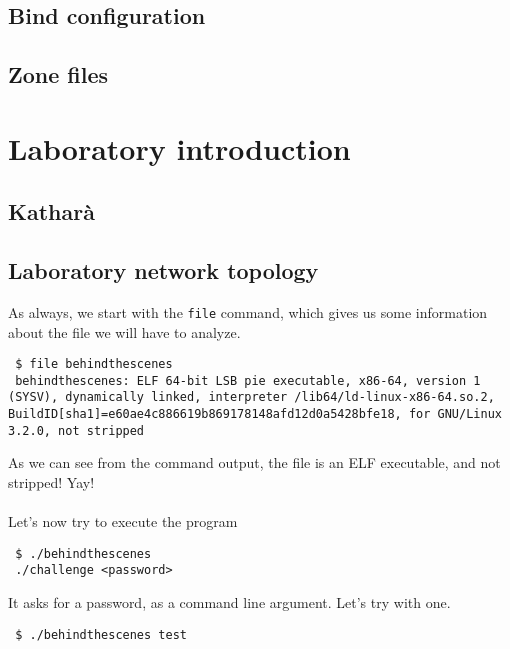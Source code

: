 \documentclass{article}
\begin{document}
\subsection{Bind configuration}

\subsection{Zone files}

\section{Laboratory introduction}

\subsection{Katharà}

\subsection{Laboratory network topology}



\noindent
As always, we start with the \texttt{file} command, which gives us some information about the file we will have to analyze.

\begin{lstlisting}
 $ file behindthescenes
 behindthescenes: ELF 64-bit LSB pie executable, x86-64, version 1 (SYSV), dynamically linked, interpreter /lib64/ld-linux-x86-64.so.2, BuildID[sha1]=e60ae4c886619b869178148afd12d0a5428bfe18, for GNU/Linux 3.2.0, not stripped
\end{lstlisting}

\noindent
As we can see from the command output,
the file is an ELF executable, and not stripped! Yay!
\\\\

\noindent
Let's now try to execute the program

\begin{lstlisting}
 $ ./behindthescenes
 ./challenge <password>
\end{lstlisting}

\noindent
It asks for a password, as a command line argument. Let's try with one.

\begin{lstlisting}
 $ ./behindthescenes test
\end{lstlisting}
\end{document}
